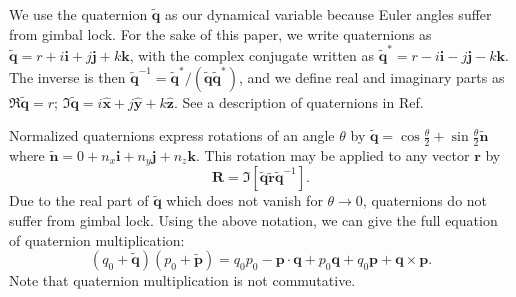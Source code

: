 \documentclass{aastex631}
\newcommand{\unit}[1]{\hat{\bm{#1}}}
\newcommand{\brackets}[1]{\left[ #1 \right]}
\newcommand{\quat}[1]{\widetilde{\bm{#1}}}
\begin{document}
We use the quaternion $\quat q$ as our dynamical variable because Euler angles suffer from gimbal lock. For the sake of this paper, we write quaternions as $\quat q = r + i \bm i + j \bm j + k \bm k$, with the complex conjugate written as $\quat q^* = r - i \bm i - j \bm j - k \bm k$. The inverse is then $\quat q^{-1} = \quat q^* / (\quat q \quat q^*)$, and we define real and imaginary parts as $\Re \quat q = r$; $\Im \quat q = i \unit x + j \unit y + k \unit z$. See a description of quaternions in Ref.~\cite{2008arXiv0811.2889G}

Normalized quaternions express rotations of an angle $\theta$ by $\quat q = \cos\frac{\theta}{2} + \sin\frac{\theta}{2}\quat n$ where $\quat n = 0 + n_x \bm i + n_y \bm j + n_z\bm k$. This rotation may be applied to any vector $\bm r$ by
\begin{equation}
\bm R = \Im \brackets{\quat q \quat r\quat q^{-1} }.
\label{eqn:quat-rot}
\end{equation}
Due to the real part of $\quat q$ which does not vanish for $\theta \rightarrow 0$, quaternions do not suffer from gimbal lock. Using the above notation, we can give the full equation of quaternion multiplication:
\begin{equation}
(q_0 + \quat q) (p_0 + \quat p) = q_0 p_0 - \bm p \cdot \bm q + p_0 \bm q + q_0 \bm p + \bm q \times \bm p.
\label{eqn:quat-mult}
\end{equation}
Note that quaternion multiplication is not commutative.
\end{document}
